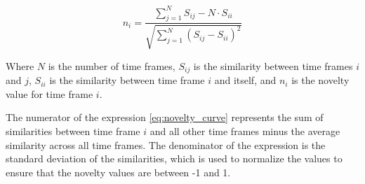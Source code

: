 \begin{equation}
\label{eq:novelty_curve}
n_i = \frac{\sum\limits_{j=1}^{N} S_{ij} - N\cdot S_{ii}}{\sqrt{\sum\limits_{j=1}^{N} (S_{ij} - S_{ii})^2}}
\end{equation}

Where $N$ is the number of time frames, $S_{ij}$ is the similarity between time frames $i$ and $j$, $S_{ii}$ is the similarity between time frame $i$ and itself, and $n_i$ is the novelty value for time frame $i$.

The numerator of the expression \ref{eq:novelty_curve} represents the sum of similarities between time frame $i$ and all other time frames minus the average similarity across all time frames. The denominator of the expression is the standard deviation of the similarities, which is used to normalize the values to ensure that the novelty values are between -1 and 1.
